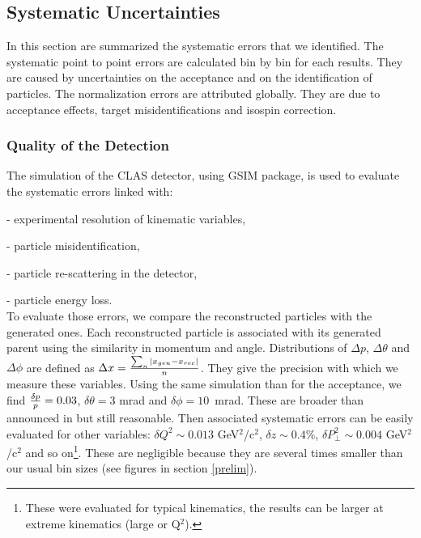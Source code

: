 \subsection{Systematic Uncertainties}
\label{sec:TotSys}

In this section are summarized the systematic errors that we identified. The 
systematic point to point errors are calculated bin by bin for each results.
They are caused by uncertainties on the acceptance and on the identification of 
particles. The normalization errors are attributed globally. They are due to 
acceptance effects, target misidentifications and isospin correction.

\subsubsection{Quality of the Detection}
\label{SysId}

The simulation of the CLAS detector, using GSIM package, is used 
to evaluate the systematic errors linked with:

  - experimental resolution of kinematic variables,

  - particle misidentification,

  - particle re-scattering in the detector,

  - particle energy loss.\\


To evaluate those errors, we compare the reconstructed particles with the 
generated ones. Each reconstructed particle is associated with its generated parent using the
similarity in momentum and angle.
Distributions of $\Delta p$, $\Delta \theta$ and $\Delta \phi$ are defined as 
$\Delta x = {\sum_n |x_{gen} - x_{rec}| \over n}$. They give the precision with which we measure 
these variables. Using the same simulation than for the acceptance, we find 
${\delta p \over p } = 0.03$, $\delta \theta = 3$ mrad and 
$\delta \phi = 10$~mrad. These are broader than announced in \cite{Mecking:2003zu} 
but still reasonable. Then associated systematic errors can be easily 
evaluated for other variables: $\delta Q^2 \sim 0.013$ GeV$^2$/c$^2$, $\delta z \sim 
0.4 \%$, $\delta P_\perp^2 \sim 0.004$ GeV$^2$/c$^2$ and so on\footnote{These were 
evaluated for typical kinematics, the results can be larger at 
extreme kinematics (large \pt or Q$^2$).}. These are negligible because they are 
several times smaller than our usual bin sizes (see figures in section 
\ref{prelim}). 

